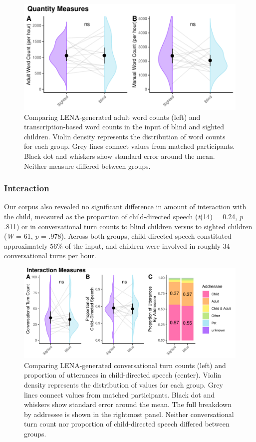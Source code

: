 \documentclass[
  man]{apa6}
\begin{document}
\begin{figure}
\centering
\includegraphics{input_quality_manuscript_files/figure-latex/quantity-plots-1.pdf}
\caption{\label{fig:quantity-plots}Comparing LENA-generated adult word counts (left) and transcription-based word counts in the input of blind and sighted children. Violin density represents the distribution of word counts for each group. Grey lines connect values from matched participants. Black dot and whiskers show standard error around the mean. Neither measure differed between groups.}
\end{figure}

\hypertarget{interaction-1}{%
\subsubsection{Interaction}\label{interaction-1}}

Our corpus also revealed no significant difference in amount of interaction with the child, measured as the proportion of child-directed speech (\emph{t}(14) = 0.24, \emph{p} = .811) or in conversational turn counts to blind children versus to sighted children (\emph{W} = 61, \emph{p} = .978). Across both groups, child-directed speech constituted approximately 56\% of the input, and children were involved in roughly 34 conversational turns per hour.

\begin{figure}
\centering
\includegraphics{input_quality_manuscript_files/figure-latex/interaction-plots-1.pdf}
\caption{\label{fig:interaction-plots}Comparing LENA-generated conversational turn counts (left) and proportion of utterances in child-directed speech (center). Violin density represents the distribution of values for each group. Grey lines connect values from matched participants. Black dot and whiskers show standard error around the mean. The full breakdown by addressee is shown in the rightmost panel. Neither conversational turn count nor proportion of child-directed speech differed between groups.}
\end{figure}
\end{document}
